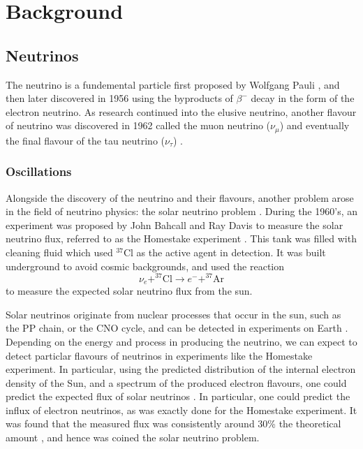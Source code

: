 \chapter{Background}\label{ch:Background}

\section{Neutrinos}

The neutrino is a fundemental particle first proposed by Wolfgang Pauli \cite{nu_proposition}, and then later discovered in 1956 using the byproducts of $\beta^{-}$ decay \cite{aneut} in the form of the electron neutrino. As research continued into the elusive neutrino, another flavour of neutrino was discovered in 1962 called the muon neutrino ($\nu_{\mu}$) \cite{m_nu} and eventually the final flavour of the tau neutrino ($\nu_\tau$) \cite{t_nu}. 

\subsection{Oscillations}\label{subsec:osc}

Alongside the discovery of the neutrino and their flavours, another problem arose in the field of neutrino physics: the solar neutrino problem \cite{lowe_nu}. During the 1960's, an experiment was proposed by John Bahcall and Ray Davis to measure the solar neutrino flux, referred to as the Homestake experiment \cite{davis, bahcall}. This tank was filled with cleaning fluid which used $^{37}$Cl as the active agent in detection. It was built underground to avoid cosmic backgrounds, and used the reaction\cite{davis, bahcall}
\begin{equation}\label{eq:cl}
  \nu_{e} + ^{37}\text{Cl} \to e^{-} + ^{37}\text{Ar}
\end{equation}
to measure the expected solar neutrino flux from the sun. 

Solar neutrinos originate from nuclear processes that occur in the sun, such as the PP chain, or the CNO cycle, and can be detected in experiments on Earth \cite{solar_nu}. Depending on the energy and process in producing the neutrino, we can expect to detect particlar flavours of neutrinos in experiments like the Homestake experiment. In particular, using the predicted distribution of the internal electron density of the Sun, and a spectrum of the produced electron flavours, one could predict the expected flux of solar neutrinos \cite{solar_nu}. In particular, one could predict the influx of electron neutrinos, as was exactly done for the Homestake experiment. It was found that the measured flux was consistently around 30\% the theoretical amount \cite{davis, bahcall, solar_nu}, and hence was coined the solar neutrino problem.

